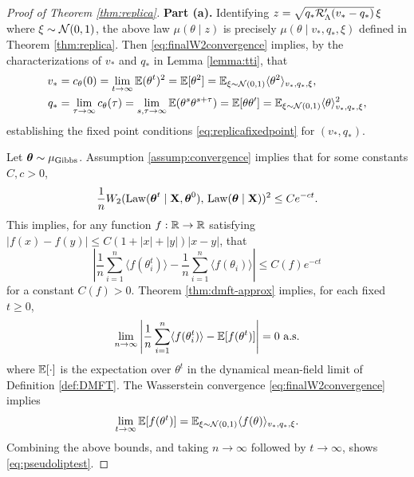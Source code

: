 \begin{proof}[Proof of Theorem \ref{thm:replica}]
{\bf Part (a).}
Identifying $z=\sqrt{q_*\mathcal{R}_\Lambda'(v_*-q_*)}\,\xi$ where $\xi
\sim \mathcal{N}(0,1)$, the above law $\mu(\theta \mid z)$ is precisely
$\mu(\theta \mid v_*,q_*,\xi)$ defined in Theorem \ref{thm:replica}.
Then \eqref{eq:finalW2convergence} implies,
by the characterizations of $v_*$ and $q_*$ in Lemma \ref{lemma:tti}, that
\begin{align*}
v_*&=c_\theta(0)=\lim_{t \to \infty} \mathbb{E}(\theta^t)^2=\mathbb{E}[\theta^2]
=\mathbb{E}_{\xi \sim \mathcal{N}(0,1)} \langle \theta^2 \rangle_{v_*,q_*,\xi},\\
q_*&=\lim_{\tau \to \infty} c_\theta(\tau)
=\lim_{s,\tau \to \infty} \mathbb{E}(\theta^s\theta^{s+\tau})=\mathbb{E}[\theta\theta']
=\mathbb{E}_{\xi \sim \mathcal{N}(0,1)} \langle \theta \rangle_{v_*,q_*,\xi}^2,
\end{align*}
establishing the fixed point conditions \eqref{eq:replicafixedpoint} for
$(v_*,q_*)$.

Let $\boldsymbol{\theta} \sim \mu_{\mathrm{Gibbs}}$. Assumption
\ref{assump:convergence} implies
that for some constants $C,c>0$,
\begin{equation}\label{eq:langevinWasserstein}
\frac{1}{n}W_2(\operatorname{Law}(\boldsymbol{\theta}^t \mid \mathbf{X},\boldsymbol{\theta}^0),\,\operatorname{Law}(\boldsymbol{\theta} \mid \mathbf{X}))^2
\leq Ce^{-ct}.
\end{equation}
This implies, for any function $f:\mathbb{R} \to \mathbb{R}$ satisfying $|f(x)-f(y)| \leq
C(1+|x|+|y|)|x-y|$, that
\[\left|\frac{1}{n}\sum_{i=1}^n \langle f(\theta_i^t)
\rangle-\frac{1}{n}\sum_{i=1}^n \langle f(\theta_i) \rangle \right|
\leq C(f)e^{-ct}\]
for a constant $C(f)>0$. Theorem \ref{thm:dmft-approx} implies, for each fixed
$t \geq 0$,
\[\lim_{n \to \infty}
\left|\frac{1}{n}\sum_{i=1}^n \langle f(\theta_i^t) \rangle-\mathbb{E}[f(\theta^t)]
\right|=0 \text{ a.s.}\]
where $\mathbb{E}[\cdot]$ is the expectation over $\theta^t$ in the dynamical mean-field
limit of Definition \ref{def:DMFT}. The Wasserstein convergence
\eqref{eq:finalW2convergence} implies
\[\lim_{t \to \infty} \mathbb{E}[f(\theta^t)]=\mathbb{E}_{\xi \sim \mathcal{N}(0,1)} \langle f(\theta)
\rangle_{v_*,q_*,\xi}.\]
Combining the above bounds, and taking $n \to \infty$ followed by $t \to
\infty$, shows \eqref{eq:pseudoliptest}.


\end{proof}
